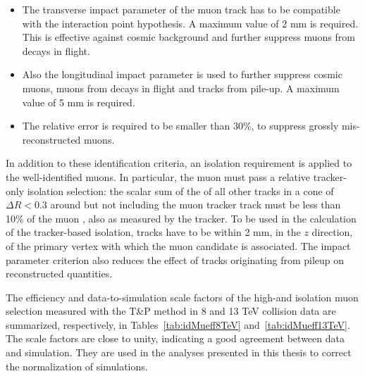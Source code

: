 \begin{itemize}
\item The transverse impact parameter of the muon track has to be compatible with the interaction point hypothesis. A maximum value of 2 mm is required. This is effective against cosmic background and further suppress muons from decays in flight.
\item Also the longitudinal impact parameter is used to further suppress cosmic muons, muons from decays in flight and tracks from pile-up. A maximum value of 5 mm is required. 
\item The relative \pt error is required to be smaller than 30\%, to suppress grossly mis-reconstructed muons.
\end{itemize}

In addition to these identification criteria, an isolation requirement is applied to the well-identified muons. In particular, the muon must pass a relative tracker-only isolation selection: the scalar sum of the \pt of all other tracks in a cone of  $\Delta R < 0.3$ around but not including the muon tracker track must be less than 10\% of the muon \pt, also as measured by the tracker. To be used in the calculation of the tracker-based isolation, tracks have to be within 2 mm, in the $z$ direction, of the primary vertex with which the muon candidate is associated. The impact parameter criterion also reduces the effect of tracks originating from pileup on reconstructed quantities.

The efficiency and data-to-simulation scale factors of the high-\pt and isolation muon selection measured with the T\&P method in 8 and 13 TeV collision data are summarized, respectively, in Tables~\ref{tab:idMueff8TeV} and~\ref{tab:idMueff13TeV}. The scale factors are close to unity, indicating a good agreement between data and simulation. They are used in the analyses presented in this thesis to correct the normalization of simulations.

